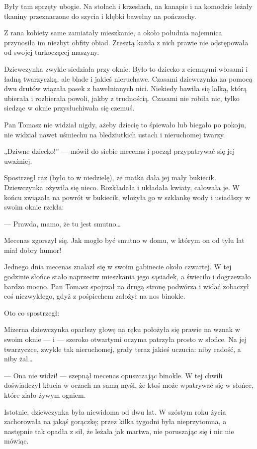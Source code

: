 Były tam sprzęty ubogie. Na stołach i krzesłach, na kanapie i na
komodzie leżały tkaniny przeznaczone do szycia i kłębki bawełny na
pończochy.

Z rana kobiety same zamiatały mieszkanie, a około południa najemnica
przynosiła im niezbyt obfity obiad. Zresztą każda z nich prawie nie
odstępowała od swojej turkoczącej maszyny.

Dziewczynka zwykle siedziała przy oknie. Było to dziecko z ciemnymi
włosami i ładną twarzyczką, ale blade i jakieś nieruchawe. Czasami
dziewczynka za pomocą dwu drutów wiązała pasek z bawełnianych
nici. Niekiedy bawiła się lalką, którą ubierała i rozbierała powoli,
jakby z trudnością. Czasami nie robiła nic, tylko siedząc w oknie
przysłuchiwała się czemuś.

Pan Tomasz nie widział nigdy, ażeby dziecię to śpiewało lub biegało po
pokoju, nie widział nawet uśmiechu na bledziutkich ustach i
nieruchomej twarzy.

„Dziwne dziecko!” — mówił do siebie mecenas i począł przypatrywać się
jej uważniej.

Spostrzegł raz (było to w niedzielę), że matka dała jej mały
bukiecik. Dziewczynka ożywiła się nieco. Rozkładała i układała kwiaty,
całowała je. W końcu związała na powrót w bukiecik, włożyła go w
szklankę wody i usiadłszy w swoim oknie rzekła:

— Prawda, mamo, że tu jest smutno…

Mecenas zgorszył się. Jak mogło być smutno w domu, w którym on od tylu
lat miał dobry humor!

Jednego dnia mecenas znalazł się w swoim gabinecie około czwartej. W
tej godzinie słońce stało naprzeciw mieszkania jego sąsiadek, a
świeciło i dogrzewało bardzo mocno. Pan Tomasz spojrzał na drugą
stronę podwórza i widać zobaczył coś niezwykłego, gdyż z pośpiechem
założył na nos binokle.

Oto co spostrzegł:

Mizerna dziewczynka oparłszy głowę na ręku położyła się prawie na
wznak w swoim oknie — i — szeroko otwartymi oczyma patrzyła prosto w
słońce. Na jej twarzyczce, zwykle tak nieruchomej, grały teraz jakieś
uczucia: niby radość, a niby żal…

— Ona nie widzi! — szepnął mecenas opuszczając binokle. W tej chwili
doświadczył kłucia w oczach na samą myśl, że ktoś może wpatrywać się w
słońce, które ziało żywym ogniem.

Istotnie, dziewczynka była niewidoma od dwu lat. W szóstym roku życia
zachorowała na jakąś gorączkę; przez kilka tygodni była nieprzytomna,
a następnie tak opadła z sił, że leżała jak martwa, nie poruszając się
i nic nie mówiąc.

